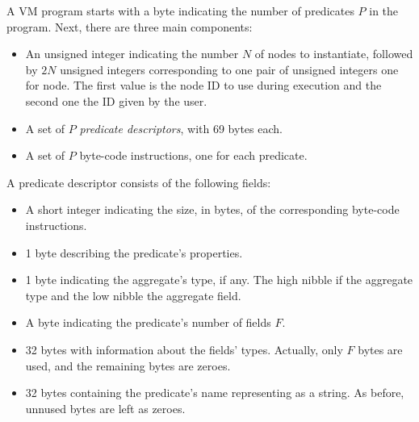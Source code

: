 \documentclass{article}
\begin{document}
\newcommand{\inst}[3]{#1&\byte#2\\\endbyte&{\it #3}\\}
\newcommand{\op}[2]{\ensuremath{#1}&\byte#2\\\endbyte\\}
\newcommand{\val}[3]{#1&\byte#2\\\endbyte&{\it #3}\\}


A VM program starts with a byte indicating the number of predicates $P$ in the
program. Next, there are three main components:

\begin{itemize}
	\item An unsigned integer indicating the number $N$ of nodes to instantiate, followed by $2N$ unsigned integers corresponding to one pair of unsigned integers one for node. The first value is the node ID to use during execution and the second one the ID given by the user.
	\item A set of $P$ \emph{predicate descriptors}, with 69 bytes each.
	\item A set of $P$ byte-code instructions, one for each predicate.
\end{itemize}

A predicate descriptor consists of the following fields:
\begin{itemize}
	\item A short integer indicating the size, in bytes, of the corresponding byte-code instructions.
	\item 1 byte describing the predicate's properties.
	\item 1 byte indicating the aggregate's type, if any. The high nibble if the aggregate type and the low nibble the aggregate field.
	\item A byte indicating the predicate's number of fields $F$.
	\item 32 bytes with information about the fields' types. Actually, only $F$ bytes are used, and the remaining bytes are zeroes.
	\item 32 bytes containing the predicate's name representing as a string. As before, unnused bytes are left as zeroes.
\end{itemize}
\end{document}
